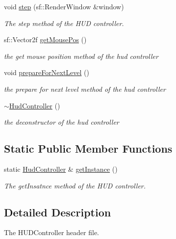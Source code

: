 \begin{DoxyCompactItemize}
void \hyperlink{class_hud_controller_a6cd82988ca9221b6cb8d520a8e26b204}{step} (sf\-::\-Render\-Window \&window)
\begin{DoxyCompactList}\small\item\em The step method of the H\-U\-D controller. \end{DoxyCompactList}\item 
sf\-::\-Vector2f \hyperlink{class_hud_controller_a4c6c9c53841c41d156a2f715a43be703}{get\-Mouse\-Pos} ()
\begin{DoxyCompactList}\small\item\em the get mouse position method of the hud controller \end{DoxyCompactList}\item 
void \hyperlink{class_hud_controller_a9e9c4e19bdb0bc55247c96e79c5548c3}{prepare\-For\-Next\-Level} ()
\begin{DoxyCompactList}\small\item\em the prepare for next level method of the hud controller \end{DoxyCompactList}\item 
\hyperlink{class_hud_controller_a53264716b1a602a351a7bfcebb0d4dc1}{$\sim$\-Hud\-Controller} ()
\begin{DoxyCompactList}\small\item\em the deconstructor of the hud controller \end{DoxyCompactList}\end{DoxyCompactItemize}
\subsection*{Static Public Member Functions}
\begin{DoxyCompactItemize}
\item 
static \hyperlink{class_hud_controller}{Hud\-Controller} \& \hyperlink{class_hud_controller_a9dafa97894bb74e7ada5ab5f76b886c4}{get\-Instance} ()
\begin{DoxyCompactList}\small\item\em The get\-Insatnce method of the H\-U\-D controller. \end{DoxyCompactList}\end{DoxyCompactItemize}


\subsection{Detailed Description}
The H\-U\-D\-Controller header file. 

